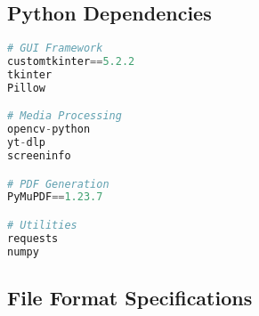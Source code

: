 \documentclass[11pt,a4paper]{article}
\begin{document}
\subsection{Python Dependencies}
\begin{tcolorbox}[title=Required Python Packages]
\begin{lstlisting}[language=Python]
# GUI Framework
customtkinter==5.2.2
tkinter
Pillow

# Media Processing
opencv-python
yt-dlp
screeninfo

# PDF Generation
PyMuPDF==1.23.7

# Utilities
requests
numpy
\end{lstlisting}
\end{tcolorbox}

\subsection{File Format Specifications}
\end{document}
